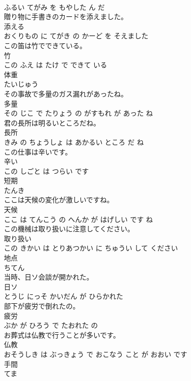 \documentclass[8pt]{extreport}
\begin{document}
\begin{CJK}{UTF8}{min}
\\	ふるい てがみ を もやした ん だ			
\\	贈り物に手書きのカードを添えました。	
\\	添える 
\\	おくりもの に てがき の かーど を そえました			
\\	この笛は竹でできている。	
\\	竹 
\\	この ふえ は たけ で できて いる			
\\	体重	
\\	たいじゅう		
\\	その事故で多量のガス漏れがあったね。	
\\	多量 
\\	その じこ で たりょう の がすもれ が あった ね			
\\	君の長所は明るいところだね。	
\\	長所 
\\	きみ の ちょうしょ は あかるい ところ だ ね			
\\	この仕事は辛いです。	
\\	辛い 
\\	この しごと は つらい です			
\\	短期	
\\	たんき		
\\	ここは天候の変化が激しいですね。	
\\	天候 
\\	ここ は てんこう の へんか が はげしい です ね			
\\	この機械は取り扱いに注意してください。	
\\	取り扱い 
\\	この きかい は とりあつかい に ちゅうい して ください			
\\	地点	
\\	ちてん		
\\	当時、日ソ会談が開かれた。	
\\	日ソ 
\\	とうじ にっそ かいだん が ひらかれた			
\\	部下が疲労で倒れたの。	
\\	疲労 
\\	ぶか が ひろう で たおれた の			
\\	お葬式は仏教で行うことが多いです。	
\\	仏教 
\\	おそうしき は ぶっきょう で おこなう こと が おおい です			
\\	手間	
\\	てま		

\end{CJK}
\end{document}
